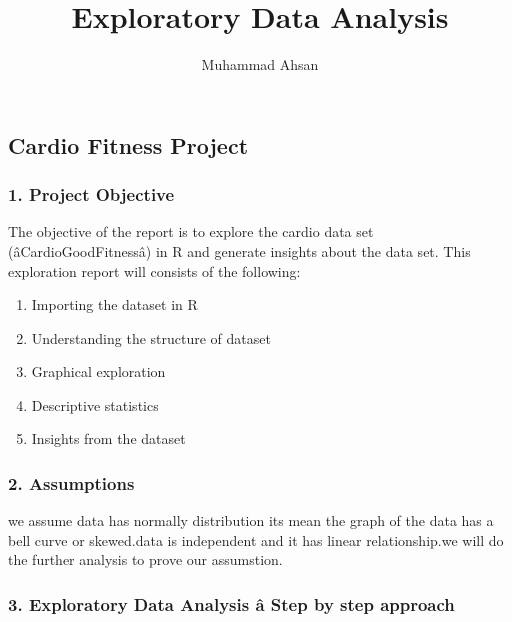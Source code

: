 \documentclass[
]{article}
\title{Exploratory Data Analysis}
\author{Muhammad Ahsan}
\date{}
\providecommand{\tightlist}{%
  \setlength{\itemsep}{0pt}\setlength{\parskip}{0pt}}
\begin{document}
\maketitle

\hypertarget{cardio-fitness-project}{%
\subsection{Cardio Fitness Project}\label{cardio-fitness-project}}

\hypertarget{project-objective}{%
\subsubsection{1. Project Objective}\label{project-objective}}

The objective of the report is to explore the cardio data set
(âCardioGoodFitnessâ) in R and generate insights about the data set.
This exploration report will consists of the following:

\begin{enumerate}
\def\labelenumi{\arabic{enumi}.}
\tightlist
\item
  Importing the dataset in R\\
\item
  Understanding the structure of dataset\\
\item
  Graphical exploration\\
\item
  Descriptive statistics\\
\item
  Insights from the dataset
\end{enumerate}

\hypertarget{assumptions}{%
\subsubsection{2. Assumptions}\label{assumptions}}

we assume data has normally distribution its mean the graph of the data
has a bell curve or skewed.data is independent and it has linear
relationship.we will do the further analysis to prove our assumstion.

\hypertarget{exploratory-data-analysis-uxe2-step-by-step-approach}{%
\subsubsection{3. Exploratory Data Analysis â Step by step
approach}\label{exploratory-data-analysis-uxe2-step-by-step-approach}}
\end{document}
